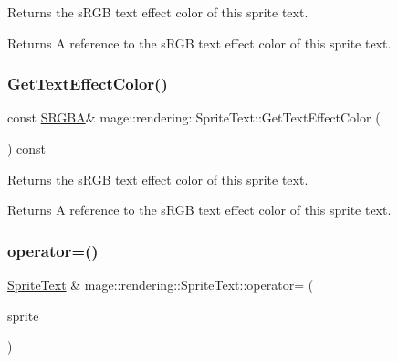 Returns the s\+R\+GB text effect color of this sprite text.

\begin{DoxyReturn}{Returns}
A reference to the s\+R\+GB text effect color of this sprite text. 
\end{DoxyReturn}
\hypertarget{classmage_1_1rendering_1_1_sprite_text_addb7c5b8fdf87bf2ccd3259ad92df464}{}\label{classmage_1_1rendering_1_1_sprite_text_addb7c5b8fdf87bf2ccd3259ad92df464} 
\subsubsection{\texorpdfstring{Get\+Text\+Effect\+Color()}{GetTextEffectColor()}\hspace{0.1cm}{\footnotesize\ttfamily [2/2]}}
{\footnotesize\ttfamily const \hyperlink{structmage_1_1_s_r_g_b_a}{S\+R\+G\+BA}\& mage\+::rendering\+::\+Sprite\+Text\+::\+Get\+Text\+Effect\+Color (\begin{DoxyParamCaption}{ }\end{DoxyParamCaption}) const\hspace{0.3cm}{\ttfamily [noexcept]}}

Returns the s\+R\+GB text effect color of this sprite text.

\begin{DoxyReturn}{Returns}
A reference to the s\+R\+GB text effect color of this sprite text. 
\end{DoxyReturn}
\hypertarget{classmage_1_1rendering_1_1_sprite_text_a50d21c24a019c0e8dc053a307ec421a6}{}\label{classmage_1_1rendering_1_1_sprite_text_a50d21c24a019c0e8dc053a307ec421a6} 
\subsubsection{\texorpdfstring{operator=()}{operator=()}\hspace{0.1cm}{\footnotesize\ttfamily [1/2]}}
{\footnotesize\ttfamily \hyperlink{classmage_1_1rendering_1_1_sprite_text}{Sprite\+Text} \& mage\+::rendering\+::\+Sprite\+Text\+::operator= (\begin{DoxyParamCaption}\item[{const \hyperlink{classmage_1_1rendering_1_1_sprite_text}{Sprite\+Text} \&}]{sprite }\end{DoxyParamCaption})\hspace{0.3cm}{\ttfamily [default]}}

